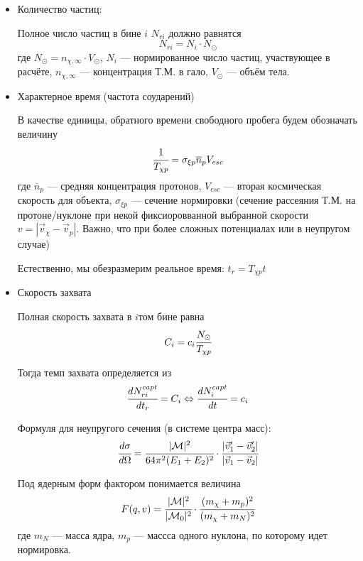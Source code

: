 \documentclass[a4paper, 14pt]{article}
\begin{document}
	
	\begin{itemize}
		\item Количество частиц:
		
		Полное число частиц в бине $i$ $N_{ri}$ должно равнятся
		\begin{equation*}
			N_{ri} = N_i \cdot N_{\odot}
		\end{equation*}
		где $N_{\odot} = n_{\chi,\infty}\cdot V_{\odot}$,  $N_i$ --- нормированное число частиц, участвующее в расчёте, $n_{\chi,\infty}$ --- концентрация Т.М. в гало, $V_{\odot}$ --- объём тела.
		\item Характерное время (частота соударений)
		
		В качестве единицы, обратного времени свободного пробега будем обозначать величину
		\begin{equation*}
			\cfrac{1}{T_{\chi p}} = 
			\sigma_{\xi p} \overline{n}_p V_{esc}
		\end{equation*}
		где $\overline{n}_p$ --- средняя концентрация протонов, $V_{esc}$ --- вторая космическая скорость для объекта, $\sigma_{\xi p}$ --- сечение нормировки (сечение рассеяния Т.М. на протоне/нуклоне при некой фиксиоровванной выбранной скорости $v = |\vec{v}_{\chi} - \vec{v}_p|$. Важно, что при более сложных потенциалах или в неупругом случае) 
		
		Естественно, мы обезразмерим реальное время: $t_r = T_{\chi p} t$
		\item Скорость захвата
		
		Полная скорость захвата в $i$том бине равна
		\begin{equation*}
			C_i = c_i \cfrac{N_{\odot}}{T_{\chi p}} 
		\end{equation*}
		
		Тогда темп захвата определяется из
		\begin{equation*}
			\cfrac{dN_{ri}^{capt}}{dt_r} = C_i \Leftrightarrow \cfrac{d N_{i}^{capt}}{dt} = c_i
		\end{equation*}
		
		Формуля для неупругого сечения (в системе центра масс):
		\begin{equation*}
			\cfrac{d\sigma}{d\Omega} = \cfrac{|\mathcal{M}|^2}{64\pi^2(E_1+E_2)^2}\cdot \cfrac{|\vec{v}_1'-\vec{v}_2'|}{|\vec{v}_1-\vec{v}_2|}
		\end{equation*}
		
		Под ядерным форм фактором понимается величина
		\begin{equation*}
			F(q,v) = \cfrac{|\mathcal{M}|^2}{|\mathcal{M}_0|^2} \cdot \cfrac{(m_{\chi}+m_{p})^2}{(m_{\chi}+m_{N})^2}
		\end{equation*}
		где $m_{N}$ --- масса ядра, $m_{p}$ --- массса одного нуклона, по которому идет нормировка.
		

\end{itemize}
\end{document}
